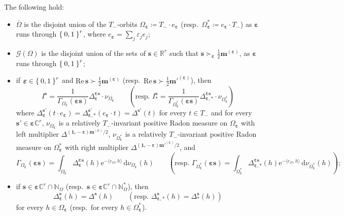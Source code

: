\documentclass[10.5pt,reqno]{amsart}
\newcommand{\ee}{\mathrm{e}}
\newcommand{\vect}[1]{\mathbf{{#1}}}
\newcommand{\dd}{\mathrm{d}}
\newcommand{\N}{\mathds{N}}
\newcommand{\C}{\mathds{C}}
\newcommand{\R}{\mathds{R}}
\newcommand{\epsb}{\mathbold{\eps}}
\newcommand{\Gc}{\mathcal{G}}
\renewcommand{\Re}{\mathrm{Re}\,}
\newcommand{\eps}{\varepsilon}
\begin{document}
\begin{prop}\label{prop:17}
The following hold:
\begin{itemize}
	\item[\textnormal{(1)}] $\overline \Omega$ is the disjoint union of the $T_-$-orbits $\Omega_\epsb\coloneqq T_-\cdot e_{\epsb}$ (resp.\ $\Omega_{\epsb}^*\coloneqq e_{\epsb}\cdot T_-$) as $\epsb$ runs through $\Set{0,1}^r$, where $e_{\epsb}=\sum_j \eps_j e_j$;
	
	\item[\textnormal{(2)}]  $\Gc(\Omega)$ is the disjoint union  of the sets of $\vect s\in \R^r$ such that $\vect s \succ_{\epsb} \frac 1 2 \vect m^{(\epsb)}$, as $\epsb$ runs through $\Set{0,1}^r$;
	
	\item[\textnormal{(3)}]  if $\epsb\in \Set{0,1}^r$ and $\Re\vect s\succ \frac 1 2 \vect m^{(\epsb)}$ (resp.\ $\Re\vect s\succ \frac 1 2 \vect m'^{(\epsb)}$), then
	\[
	I^{\vect s}=\frac{1}{\Gamma_{\Omega_\epsb}(\epsb\vect s)} \Delta^{\epsb\vect s}_{\epsb}\cdot \nu_{\Omega_\epsb} \qquad (\text{resp.\ } I^{\vect s}_*=\frac{1}{\Gamma_{\Omega_\epsb^*}(\epsb\vect s)} \Delta^{\epsb\vect s}_{\epsb,*}\cdot \nu_{\Omega_\epsb^*})
	\]
	where $  \Delta^{\vect s'}_{ \epsb}(t\cdot e_{\epsb})=\Delta^{\vect s'}_{\epsb,*}(e_\epsb\cdot t)=\Delta^{\vect s'}(t)  $  for every $t\in T_-$ and for every $\vect s'\in \epsb\C^r$, $\nu_{\Omega_\epsb}$ is a relatively $T_-$-invariant positive Radon measure on $\Omega_\epsb$ with left multiplier $\Delta^{(\vect 1_r-\epsb)\vect m^{(\epsb)}/2}$,  $\nu_{\Omega_\epsb^*}$ is a relatively $T_-$-invariant positive Radon measure on $\Omega_\epsb^*$ with right multiplier $\Delta^{(\vect 1_r-\epsb)\vect m'^{(\epsb)}/2}$, and
	\[
	\Gamma_{\Omega_\epsb}(\epsb\vect s)=\int_{\Omega_\epsb} \Delta^{\epsb\vect s}_{\epsb}(h) \ee^{-\langle e_\Omega,h\rangle}\,\dd \nu_{\Omega_\epsb}(h) \qquad (\text{resp.\ } \Gamma_{\Omega_\epsb^*}(\epsb\vect s)=\int_{\Omega_\epsb^*} \Delta^{\epsb\vect s}_{\epsb,*}(h) \ee^{-\langle e_\Omega,h\rangle}\,\dd \nu_{\Omega_\epsb^*}(h));
	\]
	
	\item[\textnormal{(4)}] if $\vect s\in \epsb \C^r\cap \N_\Omega$ (resp.\ $\vect s\in \epsb \C^r\cap \N_\Omega^*$), then 
	\[
	\Delta^{\vect s}_{\epsb}(h)=\Delta^{\vect s}(h) \qquad (\text{resp.\ } \Delta^{\vect s}_{\epsb,*}(h)=\Delta^{\vect s}_*(h))
	\]
	for every $h\in \Omega_\epsb$ (resp.\ for every $h\in \Omega_\epsb^*$).
\end{itemize}
\end{prop}
\end{document}

